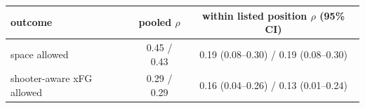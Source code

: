\begin{tabular}{lcc}
\hline
outcome & pooled $\rho$ & within listed position $\rho$ (95\% CI) \\
\hline
space allowed & 0.45 / 0.43 & 0.19 (0.08--0.30) / 0.19 (0.08--0.30) \\
shooter-aware xFG allowed & 0.29 / 0.29 & 0.16 (0.04--0.26) / 0.13 (0.01--0.24) \\
\hline
\end{tabular}
